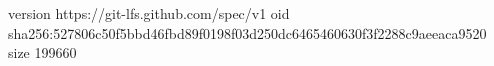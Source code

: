 version https://git-lfs.github.com/spec/v1
oid sha256:527806c50f5bbd46fbd89f0198f03d250dc6465460630f3f2288c9aeeaca9520
size 199660
